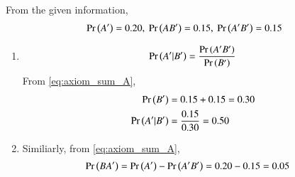From the  given information,
 \begin{align}
 \Pr\left(A^\prime\right) = 0.20,\   	
\Pr\left(AB^ \prime\right)=0.15,\ 	
\Pr\left(A ^\prime B ^\prime\right)=0.15
 \end{align} 
\begin{enumerate}
\item 
\begin{align}
 \pr{A ^\prime|B ^\prime}=\frac{\pr{ A ^\prime B ^\prime }}{\pr{B^\prime}} \label{eq:ncert/12/13/6/15/dot}
\end{align}
From 
\eqref{eq:axiom_sum_A},
\begin{align}
	\Pr\left(B^ \prime\right)&=
          0.15 +0.15 
=0.30 
\\
	\Pr\left(A^\prime|B ^\prime\right)&= \frac{0.15}{0.30}
 = 0.50
\end{align}
\item 
Similiarly, 
from 
\eqref{eq:axiom_sum_A},
\begin{align}
\Pr\left(B  A ^\prime\right)&=\Pr\left(A^\prime\right)-\Pr\left(A ^\prime B ^\prime\right) 
 = 0.20-0.15  = 0.05
\end{align}
\end{enumerate}

